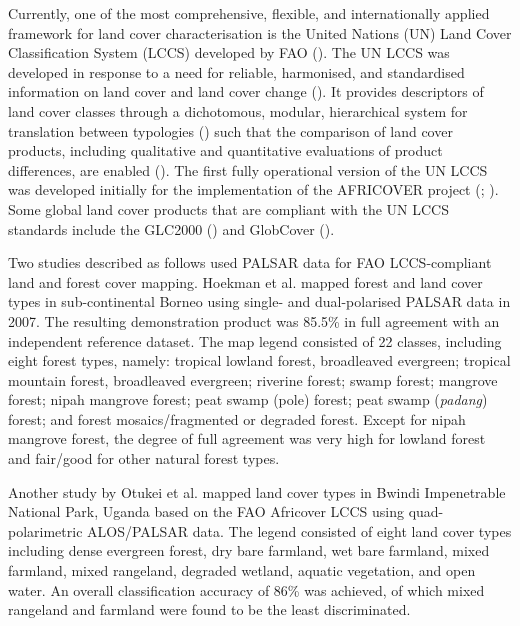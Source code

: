 Currently, one of the most comprehensive, flexible, and internationally applied framework for land cover characterisation is the United Nations (UN) Land Cover Classification System (LCCS) developed by FAO (\cite{giri_brief_2012}). The UN LCCS was developed in response to a need for reliable, harmonised, and standardised information on land cover and land cover change (\cite{di_gregorio_land_2005}). It provides descriptors of land cover classes through a dichotomous, modular, hierarchical system for translation between typologies (\cite{defourny_revisiting_2012}) such that the comparison of land cover products, including qualitative and quantitative evaluations of product differences, are enabled (\cite{kuenzer_comparing_2014}). The first fully operational version of the UN LCCS was developed initially for the implementation of the AFRICOVER project (\cite{kalensky_africover_1998}; \cite{herold_evaluating_2012}). Some global land cover products that are compliant with the UN LCCS standards include the GLC2000 (\cite{bartholome_glc2000:_2005}) and GlobCover (\cite{arino_globcover:_2007}).

Two studies described as follows used PALSAR data for FAO LCCS-compliant land and forest cover mapping. Hoekman et al. \citeyearpar{hoekman_palsar_2010} mapped forest and land cover types in sub-continental Borneo using single- and dual-polarised PALSAR data in 2007. The resulting demonstration product was 85.5\% in full agreement with an independent reference dataset. The map legend consisted of 22 classes, including eight forest types, namely: tropical lowland forest, broadleaved evergreen; tropical mountain forest, broadleaved evergreen; riverine forest; swamp forest; mangrove forest; nipah mangrove forest; peat swamp (pole) forest; peat swamp (\textit{padang}) forest; and forest mosaics/fragmented or degraded forest. Except for nipah mangrove forest, the degree of full agreement was very high for lowland forest and fair/good for other natural forest types.

Another study by Otukei et al. \citeyearpar{otukei_using_2014} mapped land cover types in Bwindi Impenetrable National Park, Uganda based on the FAO Africover LCCS using quad- polarimetric ALOS/PALSAR data. The legend consisted of eight land cover types including dense evergreen forest, dry bare farmland, wet bare farmland, mixed farmland, mixed rangeland, degraded wetland, aquatic vegetation, and open water. An overall classification accuracy of 86\% was achieved, of which mixed rangeland and farmland were found to be the least discriminated.

